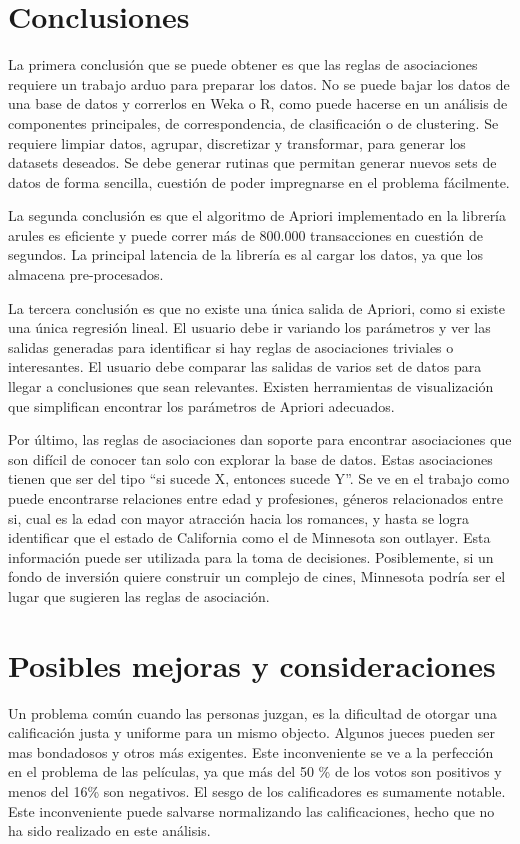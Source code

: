 \documentclass[journal]{IEEEtran}
\begin{document}
\section{Conclusiones}
La primera conclusión que se puede obtener es que las reglas de asociaciones requiere
un trabajo arduo para preparar los datos. No se puede bajar los datos de una base de datos
y correrlos en Weka o R, como puede hacerse en un análisis de componentes 
principales, de correspondencia, de clasificación o de clustering. Se requiere limpiar 
datos, agrupar, discretizar y transformar, 
para generar los datasets deseados. Se debe generar rutinas que permitan generar nuevos
sets de datos de forma sencilla, cuestión de poder impregnarse en el problema fácilmente.

La segunda conclusión es que el algoritmo de Apriori implementado en la librería arules
es eficiente y puede correr más de 800.000 transacciones en cuestión de segundos. La principal
latencia de la librería es al cargar los datos, ya que los almacena pre-procesados.

La tercera conclusión es que no existe una única salida de Apriori, como si existe una única
regresión lineal. El usuario debe ir variando
los parámetros y ver las salidas generadas para identificar si hay reglas de asociaciones
triviales o interesantes. El usuario debe comparar las salidas de varios set de datos para
llegar a conclusiones que sean relevantes. Existen herramientas de visualización que simplifican
encontrar los parámetros de Apriori adecuados.

Por último, las reglas de asociaciones dan soporte para encontrar asociaciones
que son difícil de conocer tan solo con explorar la base de datos. Estas asociaciones tienen
que ser del tipo ``si sucede X, entonces sucede Y''. Se ve en el trabajo
como puede encontrarse relaciones entre edad y profesiones, géneros relacionados entre si,
cual es la edad con mayor atracción hacia los romances, y hasta se logra identificar
que el estado de California como el de Minnesota son outlayer. Esta información puede
ser utilizada para la toma de decisiones. Posiblemente, si un
fondo de inversión quiere construir un complejo de cines, Minnesota podría ser el 
lugar que sugieren las reglas de asociación.

\section{Posibles mejoras y consideraciones}

Un problema común cuando las personas juzgan, es la dificultad de otorgar una
calificación justa y uniforme para un mismo objecto. Algunos jueces pueden ser
mas bondadosos y otros más exigentes. Este inconveniente se ve a la perfección
en el problema de las películas, ya que más del 50 \% de los votos son positivos
y menos del 16\% son negativos. El sesgo de los calificadores es sumamente notable.
Este inconveniente puede salvarse normalizando las calificaciones, hecho que no
ha sido realizado en este análisis.
\end{document}
